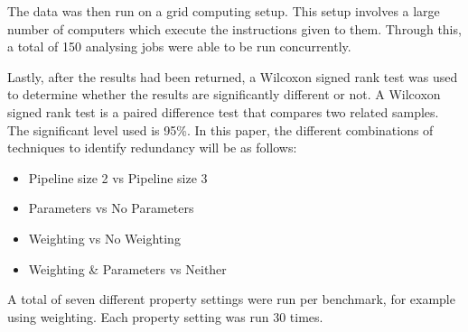 The data was then run on a grid computing setup. This setup involves a large number of computers which execute the instructions given to them. Through this, a total of 150 analysing jobs were able to be run concurrently.

Lastly, after the results had been returned, a Wilcoxon signed rank test was used to determine whether the results are significantly different or not. A Wilcoxon signed rank test is a paired difference test that compares two related samples. The significant level used is 95\%. In this paper, the different combinations of techniques to identify redundancy will be as follows:

\begin{itemize}
\item Pipeline size 2 vs Pipeline size 3
\item Parameters vs No Parameters
\item Weighting vs No Weighting
\item Weighting \& Parameters vs Neither
\end{itemize}

A total of seven different property settings were run per benchmark, for example using weighting. Each property setting was run 30 times.